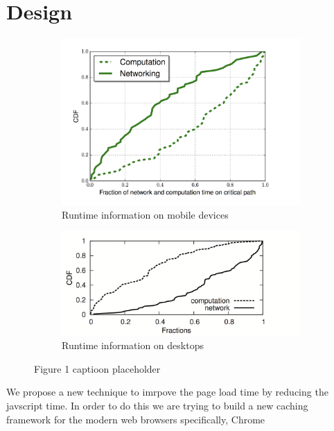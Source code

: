 \section{Design}
\label{sec:design}

\begin{figure}[!bth]
\begin{subfigure}[h]{0.5\textwidth}
\centering
\includegraphics[width=\linewidth]{figs/comp_net.png}
\caption{Runtime information on mobile devices}
\label{fig:mobile-runtime}
\end{subfigure}
\begin{subfigure}[h]{0.5\textwidth}
\centering
\includegraphics[width=\linewidth]{figs/comp_net_desk.png}
\caption{Runtime information on desktops}
\label{fig:mobile-runtime}
\end{subfigure}
\caption{{\color{red}Figure 1 captioon placeholder}}
\end{figure}
We propose a new technique to imrpove the page load time by reducing
the javscript time.  In order to do this we are trying to build a new
caching framework for the modern web browsers specifically, Chrome
